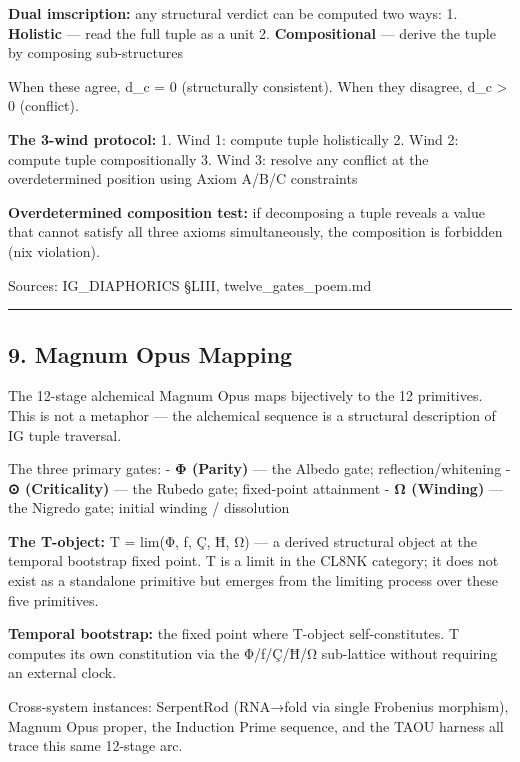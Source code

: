 \documentclass[12pt,a4paper]{article}
\begin{document}
\textbf{Dual imscription:} any structural verdict can be computed two
ways: 1. \textbf{Holistic} --- read the full tuple as a unit 2.
\textbf{Compositional} --- derive the tuple by composing sub-structures

When these agree, d\_c = 0 (structurally consistent). When they
disagree, d\_c \textgreater{} 0 (conflict).

\textbf{The 3-wind protocol:} 1. Wind 1: compute tuple holistically 2.
Wind 2: compute tuple compositionally 3. Wind 3: resolve any conflict at
the overdetermined position using Axiom A/B/C constraints

\textbf{Overdetermined composition test:} if decomposing a tuple reveals
a value that cannot satisfy all three axioms simultaneously, the
composition is forbidden (nix violation).

Sources: IG\_DIAPHORICS §LIII, twelve\_gates\_poem.md

\begin{center}\rule{0.5\linewidth}{0.5pt}\end{center}

\hypertarget{magnum-opus-mapping}{%
\subsection{9. Magnum Opus Mapping}\label{magnum-opus-mapping}}

The 12-stage alchemical Magnum Opus maps bijectively to the 12
primitives. This is not a metaphor --- the alchemical sequence is a
structural description of IG tuple traversal.

The three primary gates: - \textbf{Φ (Parity)} --- the Albedo gate;
reflection/whitening - \textbf{⊙ (Criticality)} --- the Rubedo gate;
fixed-point attainment - \textbf{Ω (Winding)} --- the Nigredo gate;
initial winding / dissolution

\textbf{The T-object:} T = lim(Φ, ƒ, Ç, Ħ, Ω) --- a derived structural
object at the temporal bootstrap fixed point. T is a limit in the CL8NK
category; it does not exist as a standalone primitive but emerges from
the limiting process over these five primitives.

\textbf{Temporal bootstrap:} the fixed point where T-object
self-constitutes. T computes its own constitution via the Φ/ƒ/Ç/Ħ/Ω
sub-lattice without requiring an external clock.

Cross-system instances: SerpentRod (RNA→fold via single Frobenius
morphism), Magnum Opus proper, the Induction Prime sequence, and the
TAOU harness all trace this same 12-stage arc.
\end{document}
